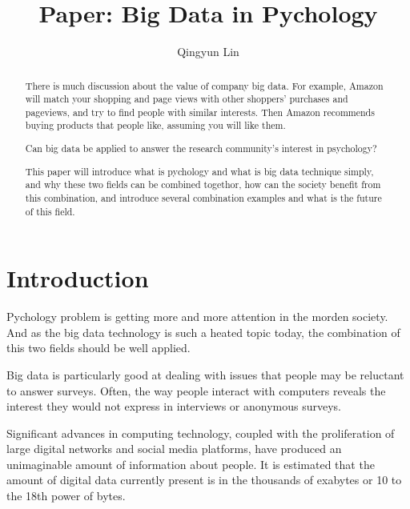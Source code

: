 
\title{Paper: Big Data in Pychology}


\author{Qingyun Lin}


\renewcommand{\shortauthors}{G. v. Laszewski}


\begin{abstract}
There is much discussion about the value of company big data. 
For example, Amazon will match your shopping and page views with 
other shoppers’ purchases and pageviews, and try to find people with 
similar interests. Then Amazon recommends buying products that people 
like, assuming you will like them.

Can big data be applied to answer the research community’s interest 
in psychology?

This paper will introduce what is pychology and what is big data 
technique simply, and why these two fields can be combined togethor, 
how can the society benefit from this combination, and introduce 
several combination examples and what is the future of this field.
\end{abstract}



\maketitle

\section{Introduction}

Pychology problem is getting more and more attention in the morden 
society. And as the big data technology is such a heated topic today, 
the combination of this two fields should be well applied.

Big data is particularly good at dealing with issues that people may 
be reluctant to answer surveys. Often, the way people interact with 
computers reveals the interest they would not express in interviews 
or anonymous surveys.

Significant advances in computing technology, coupled with the 
proliferation of large digital networks and social media platforms, 
have produced an unimaginable amount of information about people. 
It is estimated that the amount of digital data currently present is 
in the thousands of exabytes or 10 to the 18th power of bytes.

